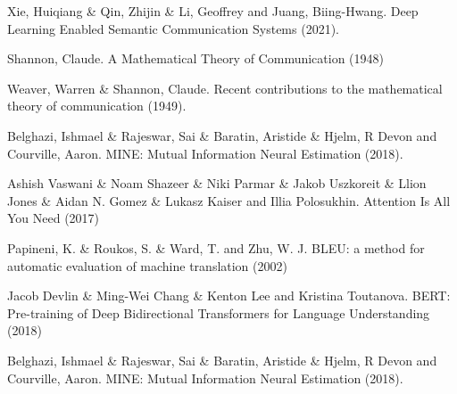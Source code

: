 \documentclass[a4paper,12pt]{article}
\begin{document}
	\clearpage
	\newpage
	\begin{thebibliography}{0}
		 Xie, Huiqiang \& Qin, Zhijin \& Li, Geoffrey and Juang, Biing-Hwang. Deep Learning Enabled Semantic Communication Systems (2021).
		
		 Shannon, Claude. A Mathematical Theory of Communication (1948)
		
		 Weaver, Warren \& Shannon, Claude. Recent contributions to the mathematical theory of communication (1949).
		
		 Belghazi, Ishmael \& Rajeswar, Sai \& Baratin, Aristide \& Hjelm, R Devon and Courville, Aaron. MINE: Mutual Information Neural Estimation (2018). 
		
		 Ashish Vaswani \& Noam Shazeer \& Niki Parmar \& Jakob Uszkoreit \& Llion Jones \& Aidan N. Gomez \& Lukasz Kaiser and Illia Polosukhin. Attention Is All You Need (2017) 		
		
		 Papineni, K. \&  Roukos, S. \& Ward, T. and Zhu, W. J. BLEU: a method for automatic evaluation of machine translation (2002)
		
		 Jacob Devlin \& Ming-Wei Chang \& Kenton Lee and Kristina Toutanova. BERT: Pre-training of Deep Bidirectional Transformers for Language Understanding (2018)
		
		 Belghazi, Ishmael \& Rajeswar, Sai \& Baratin, Aristide \& Hjelm, R Devon and Courville, Aaron. MINE: Mutual Information Neural Estimation (2018). 
		
		
		
	\end{thebibliography}
	
	
\end{document}
